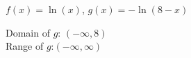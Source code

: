 {$f(x) = \ln(x)$, $g(x) = -\ln(8-x)$}
{ Domain of $g$:  $(-\infty, 8)$\\
 Range of $g$:$(-\infty, \infty)$\\

\begin{center}
\end{center}}

